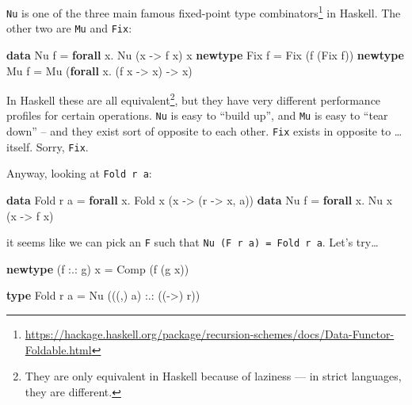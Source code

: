 \documentclass[]{article}
\newenvironment{Shaded}{}{}
\newcommand{\DataTypeTok}[1]{\textcolor[rgb]{0.56,0.13,0.00}{#1}}
\newcommand{\KeywordTok}[1]{\textcolor[rgb]{0.00,0.44,0.13}{\textbf{#1}}}
\newcommand{\NormalTok}[1]{#1}
\newcommand{\OperatorTok}[1]{\textcolor[rgb]{0.40,0.40,0.40}{#1}}
\newcommand{\OtherTok}[1]{\textcolor[rgb]{0.00,0.44,0.13}{#1}}
\renewcommand{\href}[2]{#2\footnote{\url{#1}}}
\begin{document}
\texttt{Nu} is one of the three main famous
\href{https://hackage.haskell.org/package/recursion-schemes/docs/Data-Functor-Foldable.html}{fixed-point
type combinators} in Haskell. The other two are \texttt{Mu} and \texttt{Fix}:

\begin{Shaded}
\begin{Highlighting}[]
\KeywordTok{data}    \DataTypeTok{Nu}\NormalTok{  f }\OtherTok{=} \KeywordTok{forall}\NormalTok{ x}\OperatorTok{.} \DataTypeTok{Nu}\NormalTok{ (x }\OtherTok{{-}>}\NormalTok{ f x) x}
\KeywordTok{newtype} \DataTypeTok{Fix}\NormalTok{ f }\OtherTok{=} \DataTypeTok{Fix}\NormalTok{ (f (}\DataTypeTok{Fix}\NormalTok{ f))}
\KeywordTok{newtype} \DataTypeTok{Mu}\NormalTok{  f }\OtherTok{=} \DataTypeTok{Mu}\NormalTok{ (}\KeywordTok{forall}\NormalTok{ x}\OperatorTok{.}\NormalTok{ (f x }\OtherTok{{-}>}\NormalTok{ x) }\OtherTok{{-}>}\NormalTok{ x)}
\end{Highlighting}
\end{Shaded}

In Haskell these are all equivalent\footnote{They are only equivalent in Haskell
  because of laziness --- in strict languages, they are different.}, but they
have very different performance profiles for certain operations. \texttt{Nu} is
easy to ``build up'', and \texttt{Mu} is easy to ``tear down'' -- and they exist
sort of opposite to each other. \texttt{Fix} exists in opposite to \ldots{}
itself. Sorry, \texttt{Fix}.

Anyway, looking at \texttt{Fold\ r\ a}:

\begin{Shaded}
\begin{Highlighting}[]
\KeywordTok{data} \DataTypeTok{Fold}\NormalTok{ r a }\OtherTok{=} \KeywordTok{forall}\NormalTok{ x}\OperatorTok{.} \DataTypeTok{Fold}\NormalTok{ x (x }\OtherTok{{-}>}\NormalTok{ (r }\OtherTok{{-}>}\NormalTok{ x, a))}
\KeywordTok{data} \DataTypeTok{Nu}\NormalTok{   f   }\OtherTok{=} \KeywordTok{forall}\NormalTok{ x}\OperatorTok{.} \DataTypeTok{Nu}\NormalTok{   x (x }\OtherTok{{-}>}\NormalTok{ f x)}
\end{Highlighting}
\end{Shaded}

it seems like we can pick an \texttt{F} such that
\texttt{Nu\ (F\ r\ a)\ =\ Fold\ r\ a}. Let's try\ldots{}

\begin{Shaded}
\begin{Highlighting}[]
\KeywordTok{newtype}\NormalTok{ (f }\OperatorTok{:.:}\NormalTok{ g) x }\OtherTok{=} \DataTypeTok{Comp}\NormalTok{ (f (g x))}

\KeywordTok{type} \DataTypeTok{Fold}\NormalTok{ r a }\OtherTok{=} \DataTypeTok{Nu}\NormalTok{ (((,) a) }\OperatorTok{:.:}\NormalTok{ ((}\OtherTok{{-}>}\NormalTok{) r))}
\end{Highlighting}
\end{Shaded}
\end{document}
